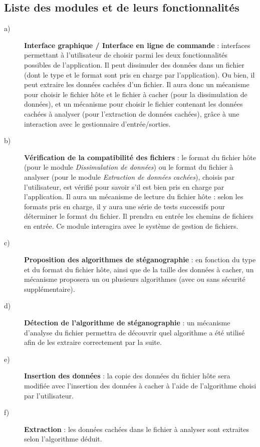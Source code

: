 \documentclass[11pt]{article}
\begin{document}
\subsection{Liste des modules et de leurs fonctionnalités}

\begin{description}
\item[a)] \textbf{Interface graphique / Interface en ligne de commande} :
    interfaces permettant à l'utilisateur de choisir parmi les deux
    fonctionnalités possibles de l'application. Il peut dissimuler des
    données dans un fichier (dont le type et le format sont pris en charge
    par l'application). Ou bien, il peut extraire les données cachées d'un
    fichier. \newline
    Il aura donc un mécanisme pour choisir le fichier hôte et le fichier 
    à cacher (pour la dissimulation de données), et un mécanisme pour choisir le 
    fichier contenant les données cachées à analyser (pour l'extraction de 
    données cachées), grâce à une interaction avec le gestionnaire d’entrée/sorties. 

\item[b)] \textbf{Vérification de la compatibilité des fichiers} : le format 
	du fichier hôte (pour le module \textit{Dissimulation de données}) ou 
	le format du fichier à analyser (pour le module \textit{Extraction de données 
	cachées}), choisis par l'utilisateur, est vérifié pour savoir s'il est 
	bien pris en charge par l'application. \newline
	Il aura un mécanisme de lecture du fichier hôte : selon les formats 
	pris en charge, il y aura une série de tests successifs pour déterminer le 
	format du fichier. 
	Il prendra en entrée les chemins de fichiers en entrée. Ce module interagira
	avec le système de gestion de fichiers. 

\item[c)] \textbf{Proposition des algorithmes de stéganographie} : en fonction
    du type et du format du fichier hôte, ainsi que de la taille des données à
    cacher, un mécanisme proposera un ou plusieurs algorithmes (avec ou sans 
    sécurité supplémentaire).  

\item[d)] \textbf{Détection de l'algorithme de stéganographie} : un mécanisme 
	d'analyse du fichier permettra de découvrir quel algorithme a été utilisé 
	afin de les extraire correctement par la suite. 

\item[e)] \textbf{Insertion des données} : la copie des données du fichier hôte
    sera modifiée avec l'insertion des données à cacher à l'aide de l'algorithme
    choisi par l'utilisateur. 

\item[f)] \textbf{Extraction} : les données cachées dans le fichier à analyser
    sont extraites selon l'algorithme déduit.

\end{description}
\newpage
\end{document}
